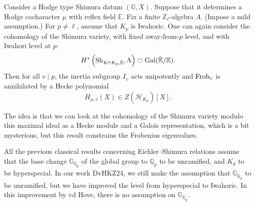 \documentclass[reqno]{amsart} 
\begin{document}
\begin{theorem}
  Consider a Hodge type Shimura datum $(\mathbb{G}, X)$.  Suppose that it determines a Hodge cocharacter $\mu$ with reflex field $\mathbb{E}$.  Fix a finite $\mathbb{Z}_{\ell}$-algebra $\Lambda$.  (Impose a mild assumption.)  For $p \neq \ell$, assume that $K_p$ is Iwahoric.  One can again consider the cohomology of the Shimura variety, with fixed away-from-$p$ level, and with Iwahori level at $p$:
  \begin{equation*}
    H^\ast \left( \mathrm{Sh}_{K^p K_p, \bar{\mathbb{E}}}, \Lambda  \right) \circlearrowleft
    \operatorname{Gal}(\bar{\mathbb{E}}/\mathbb{E}).
  \end{equation*}
  Then for all $v \mid p$, the inertia subgroup $I_v$ acts unipotently and $\operatorname{Frob}_v$ is annihilated by a Hecke polynomial
  \begin{equation*}
    H_{\mu, v}(X) \in Z(\mathcal{H}_{K_p})[X].
  \end{equation*}
\end{theorem}
The idea is that we can look at the cohomology of the Shimura variety modulo this maximal ideal as a Hecke module and a Galois representation, which is a bit mysterious, but this result constrains the Frobenius eigenvalues.

\begin{remark}
  All the previous classical results concerning Eichler--Shimura relations assume that the base change $\mathbb{G}_{\mathbb{Q}_p}$ of the global group to $\mathbb{Q}_p$ to be unramified, and $K_p$ to be hyperspecial.  In our work DvHKZ24, we still make the assumption that $\mathbb{G}_{\mathbb{Q}_p}$ to be unramified, but we have improved the level from hyperspecial to Iwahoric.  In this improvement by vd Hove, there is no assumption on $\mathbb{G}_{\mathbb{Q}_p}$.
\end{remark}
\end{document}
